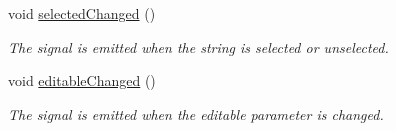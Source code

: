 \begin{DoxyCompactItemize}
\mbox{\label{classString_ab6012061024cd0862b9a8ca9fbc1896d}} 
void \mbox{\hyperlink{classString_ab6012061024cd0862b9a8ca9fbc1896d}{selected\+Changed}} ()
\begin{DoxyCompactList}\small\item\em The signal is emitted when the string is selected or unselected. \end{DoxyCompactList}\item 
\mbox{\label{classString_a9f37720f465dce86576a2ad347c386b0}} 
void \mbox{\hyperlink{classString_a9f37720f465dce86576a2ad347c386b0}{editable\+Changed}} ()
\begin{DoxyCompactList}\small\item\em The signal is emitted when the editable parameter is changed. \end{DoxyCompactList}\end{DoxyCompactItemize}
